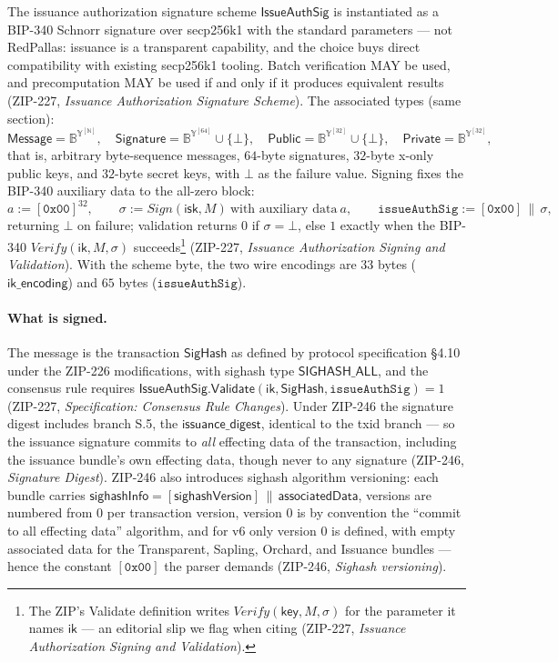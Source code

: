 \documentclass[11pt,a4paper]{article}
\theoremstyle{definition}
\begin{document}
The issuance authorization signature scheme $\mathsf{IssueAuthSig}$ is
instantiated as a BIP-340 Schnorr signature over secp256k1 with the
standard parameters --- not RedPallas: issuance is a transparent
capability, and the choice buys direct compatibility with existing
secp256k1 tooling. Batch verification MAY be used, and precomputation MAY
be used if and only if it produces equivalent results (ZIP-227,
\emph{Issuance Authorization Signature Scheme}). The associated types
(same section):
\[
\mathsf{Message} = \mathbb{B}^{\mathbb{Y}^{[\mathbb{N}]}}, \quad
\mathsf{Signature} = \mathbb{B}^{\mathbb{Y}^{[64]}} \cup \{\bot\}, \quad
\mathsf{Public} = \mathbb{B}^{\mathbb{Y}^{[32]}} \cup \{\bot\}, \quad
\mathsf{Private} = \mathbb{B}^{\mathbb{Y}^{[32]}},
\]
that is, arbitrary byte-sequence messages, $64$-byte signatures,
$32$-byte x-only public keys, and $32$-byte secret keys, with $\bot$ as
the failure value. Signing fixes the BIP-340 auxiliary data to the
all-zero block:
\[
a := [\mathtt{0x00}]^{32}, \qquad
\sigma := \mathit{Sign}(\mathsf{isk}, M)\ \text{with auxiliary data}\ a,
\qquad
\mathtt{issueAuthSig} := [\mathtt{0x00}] \,\|\, \sigma,
\]
returning $\bot$ on failure; validation returns $0$ if
$\sigma = \bot$, else $1$ exactly when the BIP-340
$\mathit{Verify}(\mathsf{ik}, M, \sigma)$
succeeds\footnote{The ZIP's Validate definition writes
$\mathit{Verify}(\mathsf{key}, M, \sigma)$ for the parameter it names
$\mathsf{ik}$ --- an editorial slip we flag when citing (ZIP-227,
\emph{Issuance Authorization Signing and Validation}).} (ZIP-227,
\emph{Issuance Authorization Signing and Validation}). With the scheme
byte, the two wire encodings are $33$ bytes
($\mathsf{ik\_encoding}$) and $65$ bytes ($\mathtt{issueAuthSig}$).

\paragraph{What is signed.} The message is the transaction
$\mathsf{SigHash}$ as defined by protocol specification \S4.10 under the
ZIP-226 modifications, with sighash type $\mathsf{SIGHASH\_ALL}$, and the
consensus rule requires
$\mathsf{IssueAuthSig.Validate}(\mathsf{ik}, \mathsf{SigHash},
\mathtt{issueAuthSig}) = 1$ (ZIP-227, \emph{Specification: Consensus Rule
Changes}). Under ZIP-246 the signature digest includes branch S.5, the
$\mathsf{issuance\_digest}$, identical to the txid branch --- so the
issuance signature commits to \emph{all} effecting data of the
transaction, including the issuance bundle's own effecting data, though
never to any signature (ZIP-246, \emph{Signature Digest}). ZIP-246 also
introduces sighash algorithm versioning: each bundle carries
$\mathsf{sighashInfo} = [\mathsf{sighashVersion}] \,\|\,
\mathsf{associatedData}$, versions are numbered from $0$ per transaction
version, version $0$ is by convention the ``commit to all effecting
data'' algorithm, and for v6 only version $0$ is defined, with empty
associated data for the Transparent, Sapling, Orchard, and Issuance
bundles --- hence the constant $[\mathtt{0x00}]$ the parser demands
(ZIP-246, \emph{Sighash versioning}).
\end{document}
